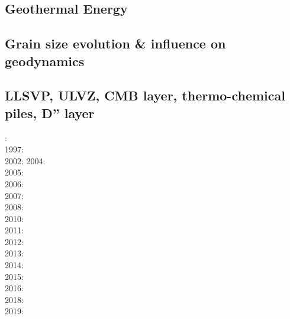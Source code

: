 \cite{davi84}\cite{hage84}
\cite{davi86}
\cite{zhgu92}\cite{kiha92}
\cite{zhch93}\cite{rirl93}
\cite{kiha94}
\cite{king95}\cite{mopa95}
\cite{mogu96}
\cite{cava98}\cite{chki98}
\cite{meco08}
\cite{king09}
\cite{ghbz10}\cite{spgs10b}
\cite{hibi12}
\cite{lizh15}
\cite{grab17}
\cite{king18}

\subsection*{Geothermal Energy} 

\cite{quxm15}
\cite{revf19}

\subsection*{Grain size evolution \& influence on geodynamics}

\cite{brcp99}
\cite{dets01}
\cite{soet02}
\cite{hapa03}\cite{reyu03}
\cite{rorb11}
\cite{beri13}
\cite{besr14}
\cite{thrk15}\cite{tukb15}\cite{pevp15}
\cite{ceww17}\cite{daef17}\cite{mube17}
\cite{bemu18}\cite{bezb18}\cite{mube18}


\subsection*{LLSVP, ULVZ, CMB layer, thermo-chemical piles, D'' layer}

: \cite{dagu86}\\
1997: \cite{kell97}\\
2002: \cite{somo02}\cite{tagh02}
2004: \cite{mczh04}\cite{nata04}\\
2005: \cite{mczh05a}\\
2006: \cite{nata06}\\
2007: \cite{heta07}\\
2008: \cite{gamc08}\cite{nata08}\\
2010: \cite{stto10}\cite{mcgr10}\cite{nata10}\\
2011: \cite{bowg11}\cite{talz11}\\
2012: \cite{stto12}\cite{dagd12}\cite{dect12}\\
2013: \cite{limc13}\cite{bogs13a}\cite{bogs13b}\\
2014: \cite{budt14}\cite{lidt14}\cite{tovd14}\\
2015: \cite{musd15}\cite{hafg15}\cite{delt15}\cite{wilm15}\\
2016: \cite{dost16}\cite{tosa16}\\
2018: \cite{daga18}\cite{lizo18}\cite{hect18}\\
2019: \cite{hebo19}\cite{rejv19}


